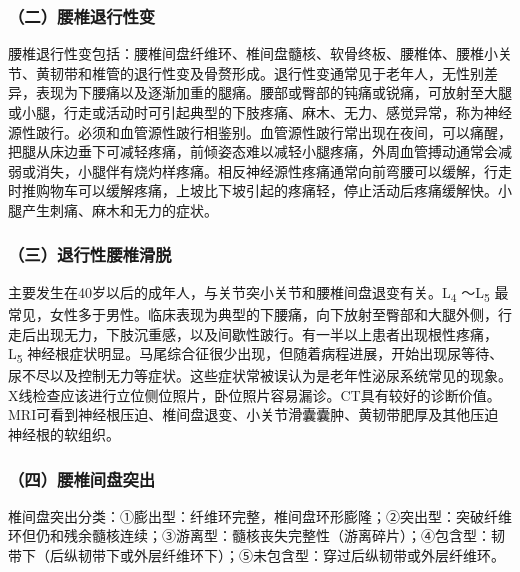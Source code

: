 \subsubsection{（二）腰椎退行性变}

腰椎退行性变包括：腰椎间盘纤维环、椎间盘髓核、软骨终板、腰椎体、腰椎小关节、黄韧带和椎管的退行性变及骨赘形成。退行性变通常见于老年人，无性别差异，表现为下腰痛以及逐渐加重的腿痛。腰部或臀部的钝痛或锐痛，可放射至大腿或小腿，行走或活动时可引起典型的下肢疼痛、麻木、无力、感觉异常，称为神经源性跛行。必须和血管源性跛行相鉴别。血管源性跛行常出现在夜间，可以痛醒，把腿从床边垂下可减轻疼痛，前倾姿态难以减轻小腿疼痛，外周血管搏动通常会减弱或消失，小腿伴有烧灼样疼痛。相反神经源性疼痛通常向前弯腰可以缓解，行走时推购物车可以缓解疼痛，上坡比下坡引起的疼痛轻，停止活动后疼痛缓解快。小腿产生刺痛、麻木和无力的症状。

\subsubsection{（三）退行性腰椎滑脱}

主要发生在40岁以后的成年人，与关节突小关节和腰椎间盘退变有关。L\textsubscript{4}
～L\textsubscript{5}
最常见，女性多于男性。临床表现为典型的下腰痛，向下放射至臀部和大腿外侧，行走后出现无力，下肢沉重感，以及间歇性跛行。有一半以上患者出现根性疼痛，L\textsubscript{5}
神经根症状明显。马尾综合征很少出现，但随着病程进展，开始出现尿等待、尿不尽以及控制无力等症状。这些症状常被误认为是老年性泌尿系统常见的现象。X线检查应该进行立位侧位照片，卧位照片容易漏诊。CT具有较好的诊断价值。MRI可看到神经根压迫、椎间盘退变、小关节滑囊囊肿、黄韧带肥厚及其他压迫神经根的软组织。

\subsubsection{（四）腰椎间盘突出}

椎间盘突出分类：①膨出型：纤维环完整，椎间盘环形膨隆；②突出型：突破纤维环但仍和残余髓核连续；③游离型：髓核丧失完整性（游离碎片）；④包含型：韧带下（后纵韧带下或外层纤维环下）；⑤未包含型：穿过后纵韧带或外层纤维环。

